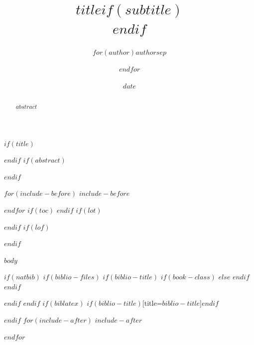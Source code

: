 \documentclass[$if(fontsize)$$fontsize$,$endif$$if(lang)$$lang$,$endif$$if(papersize)$$papersize$,$endif$$for(classoption)$$classoption$$sep$,$endfor$]{$documentclass$}
\title{$title$$if(subtitle)$\\\vspace{0.5em}{\large $subtitle$}$endif$}
\author{$for(author)$$author$$sep$ \and $endfor$}
\date{$date$}
\begin{document}
\NoBgThispage
$if(title)$
\maketitle
$endif$
$if(abstract)$
\begin{abstract}
$abstract$
\end{abstract}
$endif$

$for(include-before)$
$include-before$

$endfor$
$if(toc)$
{
\hypersetup{linkcolor=black}
\setcounter{tocdepth}{$toc-depth$}
\tableofcontents
}
$endif$
$if(lot)$
\listoftables
$endif$
$if(lof)$
\listoffigures
$endif$

\newpage

$body$

$if(natbib)$
$if(biblio-files)$
$if(biblio-title)$
$if(book-class)$
\renewcommand\bibname{$biblio-title$}
$else$
\renewcommand\refname{$biblio-title$}
$endif$
$endif$


$endif$
$endif$
$if(biblatex)$
\printbibliography$if(biblio-title)$[title=$biblio-title$]$endif$

$endif$
$for(include-after)$
$include-after$

$endfor$
\end{document}
